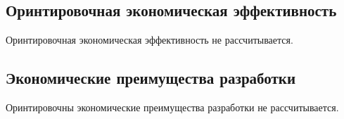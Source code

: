 \subsection{Оринтировочная экономическая эффективность}
Оринтировочная экономическая эффективность не рассчитывается.

\subsection{Экономические преимущества разработки}
Оринтировочны экономические преимущества разработки не рассчитывается.